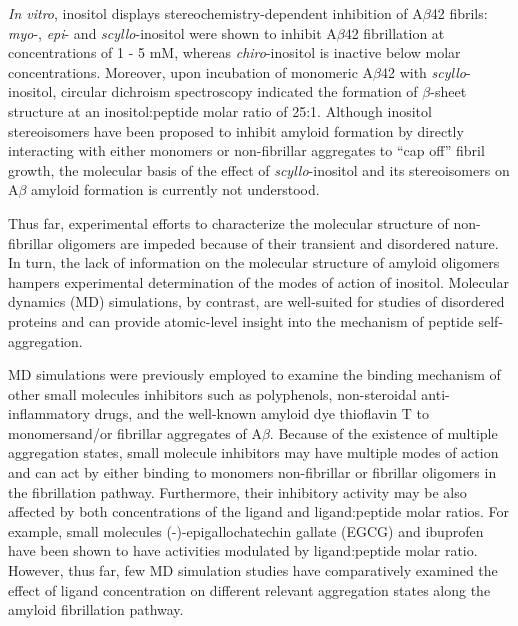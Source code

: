 \emph{In vitro}, inositol displays stereochemistry-dependent inhibition of A$\beta$42 fibrils: \emph{myo}-, \emph{epi}- and \emph{scyllo}-inositol were shown to inhibit A$\beta$42 fibrillation at concentrations of 1 - 5 mM,\cite{McLaurin:2000p64} whereas \emph{chiro}-inositol is inactive below molar concentrations.\cite{Janus:2000p198} Moreover, upon incubation of monomeric A$\beta$42 with \emph{scyllo}-inositol, circular dichroism spectroscopy indicated the formation of $\beta$-sheet structure at an inositol:peptide molar ratio of 25:1.\cite{McLaurin:1998p176} Although inositol stereoisomers have been proposed to inhibit amyloid formation by directly interacting with either monomers or non-fibrillar aggregates to ``cap off'' fibril growth,\cite{Janus:2000p198} the molecular basis of the effect of \emph{scyllo}-inositol and its stereoisomers on A$\beta$ amyloid formation is currently not understood.

Thus far, experimental efforts to characterize the molecular structure of non-fibrillar oligomers are impeded because of their transient and disordered nature. In turn, the lack of information on the molecular structure of amyloid oligomers hampers experimental determination of the modes of action of inositol. Molecular dynamics (MD) simulations, by contrast, are well-suited for studies of disordered proteins and can provide atomic-level insight into the mechanism of peptide self-aggregation.\cite{Nikolic:2011p185,Rauscher:2006p43,Li:2012p853,Rauscher:2010p5682}

MD simulations were previously employed to examine the binding mechanism of other small molecules inhibitors such as polyphenols,\cite{Lemkul:2010p23,Wang:2010p204} non-steroidal anti-inflammatory drugs\cite{Raman:2009p47,Takeda:2010p34}, and the well-known amyloid dye thioflavin T\cite{Wu:2008ds,Wu:2011fd} to monomers\cite{Liu:2009p213}and/or fibrillar aggregates of A$\beta$. Because of the existence of multiple aggregation states, small molecule inhibitors may have multiple modes of action and can act by either binding to monomers\cite{Ehrnhoefer:2008fd} non-fibrillar or fibrillar oligomers\cite{Buell:2010p9457} in the fibrillation pathway. Furthermore, their inhibitory activity may be also affected by both concentrations of the ligand and ligand:peptide molar ratios. For example, small molecules (-)-epigallochatechin gallate (EGCG)\cite{Wang:2010p204} and ibuprofen\cite{LeVine:2005cv} have been shown to have activities modulated by ligand:peptide molar ratio.  However, thus far, few MD simulation studies have comparatively examined the effect of ligand concentration on different relevant aggregation states along the amyloid fibrillation pathway. 

